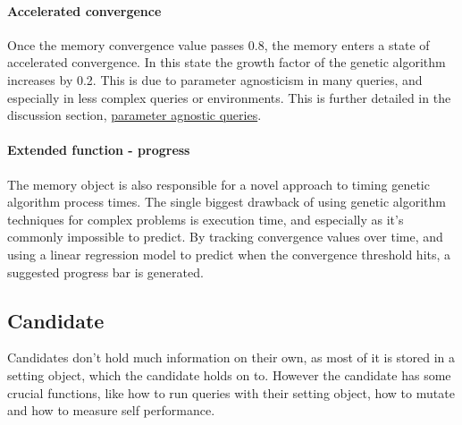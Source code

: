 \documentclass[a4paper,english]{report}
\begin{document}
		\paragraph{Accelerated convergence}
		Once the memory convergence value passes 0.8, the memory enters a state of accelerated convergence. In this state the growth factor of the genetic algorithm increases by 0.2. This is due to parameter agnosticism in many queries, and especially in less complex queries or environments. This is further detailed in the discussion section, \hyperref[sec:param_agno]{parameter agnostic queries}.
		
		\paragraph{Extended function - progress}
		The memory object is also responsible for a novel approach to timing genetic algorithm process times. The single biggest drawback of using genetic algorithm techniques for complex problems is execution time, and especially as it's commonly impossible to predict. By tracking convergence values over time, and using a linear regression model to predict when the convergence threshold hits, a suggested progress bar is generated.
		
		\clearpage
		\subsection{Candidate}
		Candidates don't hold much information on their own, as most of it is stored in a setting object, which the candidate holds on to. However the candidate has some crucial functions, like how to run queries with their setting object, how to mutate and how to measure self performance.
\end{document}
